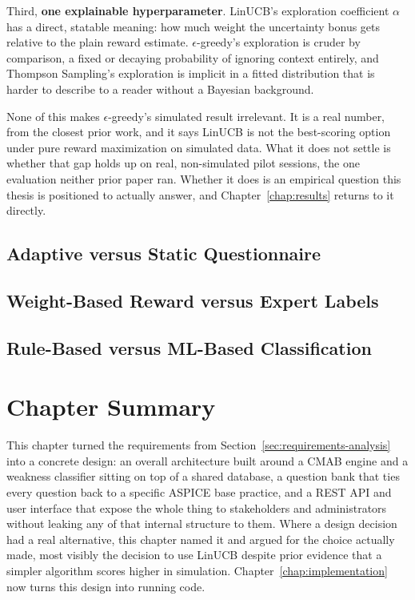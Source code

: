 \documentclass[a4paper, 12pt, oneside, openany, BCOR1cm,toc=chapterentrywithdots]{scrbook}
\begin{document}
Third, \textbf{one explainable hyperparameter}. LinUCB's exploration coefficient $\alpha$ has a
direct, statable meaning: how much weight the uncertainty bonus gets relative to the plain reward
estimate. $\epsilon$-greedy's exploration is cruder by comparison, a fixed or decaying
probability of ignoring context entirely, and Thompson Sampling's exploration is implicit in a
fitted distribution that is harder to describe to a reader without a Bayesian background.

None of this makes $\epsilon$-greedy's simulated result irrelevant. It is a real number, from the
closest prior work, and it says LinUCB is not the best-scoring option under pure reward
maximization on simulated data. What it does not settle is whether that gap holds up on real,
non-simulated pilot sessions, the one evaluation neither prior paper ran. Whether it does is an
empirical question this thesis is positioned to actually answer, and
Chapter~\ref{chap:results} returns to it directly.

\subsection{Adaptive versus Static Questionnaire}
\subsection{Weight-Based Reward versus Expert Labels}
\subsection{Rule-Based versus ML-Based Classification}

\section{Chapter Summary}

This chapter turned the requirements from Section~\ref{sec:requirements-analysis} into a
concrete design: an overall architecture built around a CMAB engine and a weakness classifier
sitting on top of a shared database, a question bank that ties every question back to a specific
ASPICE base practice, and a REST API and user interface that expose the whole thing to
stakeholders and administrators without leaking any of that internal structure to them. Where a
design decision had a real alternative, this chapter named it and argued for the choice actually
made, most visibly the decision to use LinUCB despite prior evidence that a simpler algorithm
scores higher in simulation. Chapter~\ref{chap:implementation} now turns this design into running
code.
\end{document}
